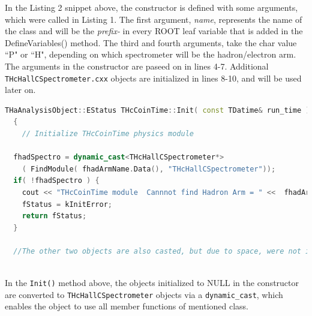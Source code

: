 \documentclass[14pt]{article}
\begin{document}
\noindent In the Listing 2 snippet above, the constructor is defined with some arguments, which were called in Listing 1. The first argument, \textit{name},
represents the name of the class and will be the \textit{prefix-} in every ROOT leaf variable that is added in the DefineVariables() method. The
third and fourth arguments, take the char value ``P" or ``H", depending on which spectrometer will be the hadron/electron arm. The arguments in
the constructor are paseed on in lines 4-7. Additional \texttt{THcHallCSpectrometer.cxx} objects are initialized in lines 8-10, and will be used later on.\\


\begin{lstlisting}[language=C++, caption={THcCoinTime.cxx, The Init() Method}] 
  THaAnalysisObject::EStatus THcCoinTime::Init( const TDatime& run_time )
  {
    // Initialize THcCoinTime physics module

  fhadSpectro = dynamic_cast<THcHallCSpectrometer*>
    ( FindModule( fhadArmName.Data(), "THcHallCSpectrometer"));
  if( !fhadSpectro ) {
    cout << "THcCoinTime module  Cannnot find Hadron Arm = " <<  fhadArmName.Data() << endl;
    fStatus = kInitError;
    return fStatus;
  }

  //The other two objects are also casted, but due to space, were not included.
  
\end{lstlisting}
In the \texttt{Init()} method above, the objects initialized to NULL in the constructor are converted to
\texttt{THcHallCSpectrometer} objects via a \texttt{dynamic\_cast}, which enables the object to use all member functions
of mentioned class. \\
\end{document}
